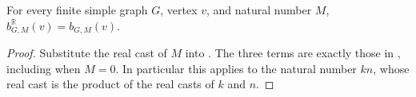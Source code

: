 \begin{lemma}
For every finite simple graph $G$, vertex $v$, and natural number $M$,
$b^{\mathbb R}_{G,M}(v)=b_{G,M}(v)$.
\end{lemma}
\begin{proof}
Substitute the real cast of $M$ into .
The three terms are exactly those in , including
when $M=0$. In particular this applies to the natural number $kn$, whose
real cast is the product of the real casts of $k$ and $n$.
\end{proof}
